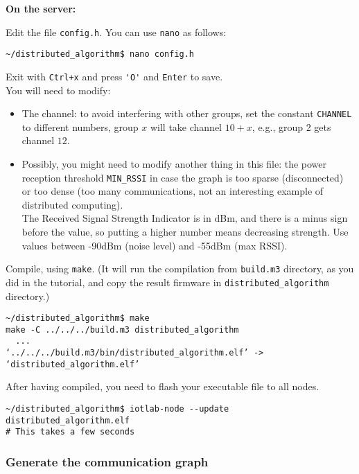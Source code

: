 \documentclass[oneside]{article}
\begin{document}
\textbf{On the server:}

Edit the file  \verb=config.h=. 
You can use \verb=nano= as follows:
    \begin{verbatim}~/distributed_algorithm$ nano config.h \end{verbatim}
Exit with \verb=Ctrl+x= and  press \verb='O'= and \verb=Enter= to save.\\
    
You will need to modify:
		\begin{itemize}
		\item The channel: to avoid interfering with other groups, set the
            constant \verb=CHANNEL= to different numbers, group $x$ will 					take channel $10+x$, e.g., group 2 gets channel $12$.
		\item Possibly, you might  need to modify another thing in this file:
            the power reception threshold \verb=MIN_RSSI= in case the graph is
            too sparse (disconnected) or too dense (too many communications, not
            an interesting example of distributed computing).\\
            The Received Signal Strength Indicator is in dBm, 
            and there is a minus sign before the value,
            so putting a higher number means decreasing strength.
            Use values between -90dBm (noise level) and -55dBm (max RSSI).
            \end{itemize}

Compile, using \verb=make=.
    (It will run the compilation from \verb=build.m3= directory, as you did in the tutorial, and copy the result firmware in \verb=distributed_algorithm= directory.)
    \begin{verbatim}~/distributed_algorithm$ make
make -C ../../../build.m3 distributed_algorithm
  ...
‘../../../build.m3/bin/distributed_algorithm.elf’ -> ‘distributed_algorithm.elf’
\end{verbatim}

After having compiled, you need to flash your executable file to all nodes.
    \begin{verbatim}~/distributed_algorithm$ iotlab-node --update distributed_algorithm.elf
# This takes a few seconds
\end{verbatim}

      


\subsubsection{Generate the communication graph}
\end{document}
